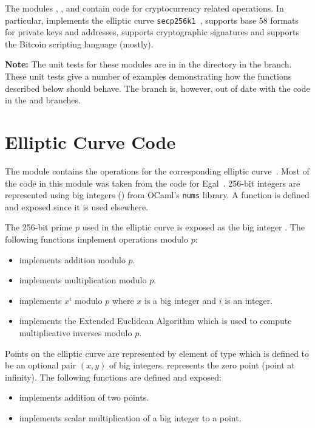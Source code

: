 The modules , ,  and 
contain code for cryptocurrency related operations.
In particular,  implements the elliptic curve {\tt{secp256k1}}~\cite{sec2final},
 supports base 58 formats for private keys and addresses,
 supports cryptographic signatures
and  supports the Bitcoin scripting language (mostly).

{\bf{Note:}} The unit tests for these modules are in {}
in the {}
directory in the {} branch.
These unit tests give a number of examples demonstrating how the functions described below should behave.
The {} branch is, however, out of date with the code in the {} and {} branches.

\section{Elliptic Curve Code}

The module  contains the operations for the corresponding elliptic curve~\cite{sec2final}.
Most of the code in this module was taken from the code for Egal~\cite{Brown2014}.
256-bit integers are represented using big integers () from OCaml's {\tt{nums}} library.
A function {} is defined and exposed since it is used elsewhere.

The 256-bit prime $p$ used in the elliptic curve is
exposed as the big integer {}.
The following functions implement operations modulo $p$:
\begin{itemize}
\item {} implements addition modulo $p$.
\item {} implements multiplication modulo $p$.
\item {} implements $x^i$ modulo $p$ where $x$ is a big integer and $i$ is an integer.
\item {} implements the Extended Euclidean Algorithm which is used to compute
multiplicative inverses modulo $p$.
\end{itemize}

Points on the elliptic curve are represented by element of type {}
which is defined to be an optional pair $(x,y)$ of big integers.
{} represents the zero point (point at infinity).
The following functions are defined and exposed:
\begin{itemize}
\item {} implements addition of two points.
\item {} implements scalar multiplication of a big integer to a point.
\end{itemize}

